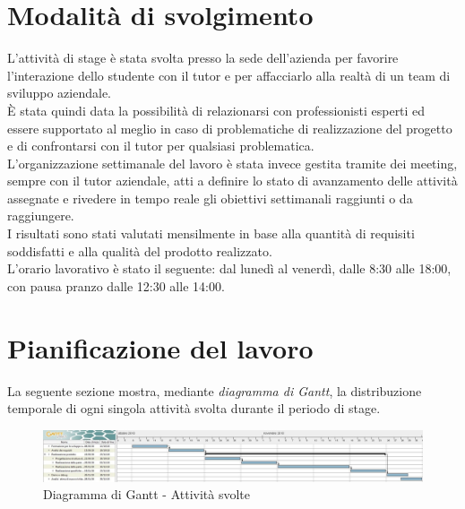 \section{Modalità di svolgimento}
L’attività di stage è stata svolta presso la sede dell'azienda per favorire l’interazione dello studente con il tutor e per affacciarlo alla realtà di un team di sviluppo aziendale.\\
È stata quindi data la possibilità di relazionarsi con professionisti esperti ed essere supportato al meglio in caso di problematiche di realizzazione del progetto e di confrontarsi con il tutor per qualsiasi problematica.\\
L’organizzazione settimanale del lavoro è stata invece gestita tramite dei meeting, sempre con il tutor aziendale, atti a definire lo stato di avanzamento delle attività assegnate e rivedere in tempo reale gli obiettivi settimanali raggiunti o da raggiungere.\\
I risultati sono stati valutati mensilmente in base alla quantità di requisiti soddisfatti e alla qualità del prodotto realizzato.\\
L’orario lavorativo è stato il seguente: dal lunedì al venerdì, dalle 8:30 alle 18:00, con pausa pranzo dalle 12:30 alle 14:00.

\section{Pianificazione del lavoro}
La seguente sezione mostra, mediante \emph{diagramma di Gantt}\glsfirstoccur, la distribuzione temporale di ogni singola attività svolta durante il periodo di stage.

\begin{figure}[!h] 
    \centering 
    \includegraphics[width=1\columnwidth]{immagini/gantt.png} 
    \caption{Diagramma di Gantt - Attività svolte}
\end{figure}
